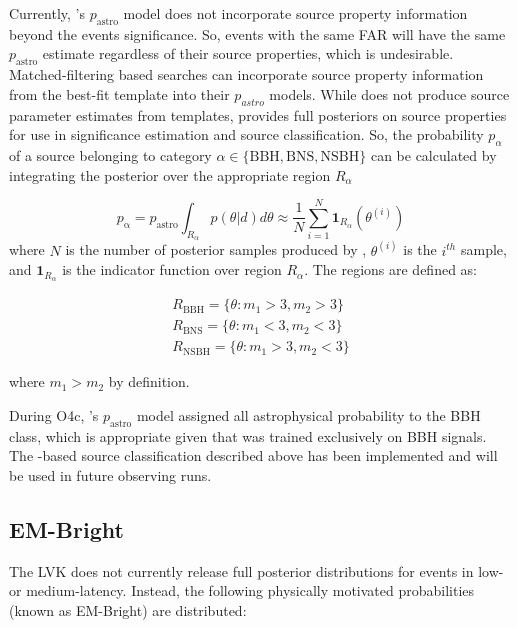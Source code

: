 \begin{refsection}
Currently, \aframe's $p_{\mathrm{astro}}$ model does not incorporate source property information beyond the events significance. 
So, events with the same FAR will have the same $p_{\mathrm{astro}}$ estimate regardless of their source properties, which is undesirable. 
Matched-filtering based searches can incorporate source property information from the best-fit template into their $p_{astro}$ models. 
While \aframe does not produce source parameter estimates from templates, \amplfi provides full posteriors on source properties for use in significance estimation and source classification. 
So, the probability $p_{\alpha}$ of a source belonging to category $\alpha \in \{\mathrm{BBH}, \mathrm{BNS}, \mathrm{NSBH}\}$ can be calculated by integrating the \amplfi posterior over the appropriate region $R_{\alpha}$

\begin{equation}
    p_{\mathrm{\alpha}} = p_{\mathrm{astro}}\int_{R_{\alpha}} p(\theta |d) d\theta
    \approx \frac{1}{N}\sum_{i=1}^{N}\mathbf{1}_{R_\alpha}(\theta^{(i)})
\end{equation}
where $N$ is the number of posterior samples produced by \amplfi, $\theta^{(i)}$ is the $i^{th}$ sample, and $\mathbf{1}_{R_\alpha}$ is the indicator function over region $R_\alpha$.
The regions are defined as:

\begin{align}
    R_{\mathrm{BBH}} = \{ \theta : m_1 > 3, m_2 > 3\} \\
    R_{\mathrm{BNS}} = \{ \theta : m_1 <3, m_2 < 3\} \\ 
    R_{\mathrm{NSBH}} = \{ \theta: m_1 > 3, m_2 < 3\}
\end{align}

where $m_1 > m_2$ by definition.

During O4c, \aframe's $p_{\mathrm{astro}}$ model assigned all astrophysical probability to the BBH class, which is appropriate given that \aframe was trained exclusively on BBH signals.
The \amplfi-based source classification described above has been implemented and will be used in future observing runs.

\subsection{EM-Bright}
The LVK does not currently release full posterior distributions for events in low- or medium-latency. 
Instead, the following physically motivated probabilities (known as EM-Bright) are distributed:


\end{refsection}
